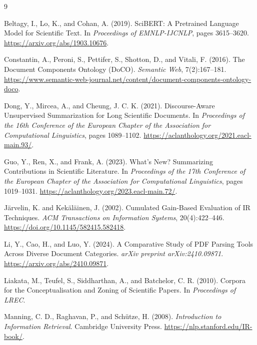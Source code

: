 \documentclass[12pt]{article}
\begin{document}
\begin{thebibliography}{9}

Beltagy, I., Lo, K., and Cohan, A. (2019).
\newblock SciBERT: A Pretrained Language Model for Scientific Text.
\newblock In \textit{Proceedings of EMNLP-IJCNLP}, pages 3615--3620.
\newblock \url{https://arxiv.org/abs/1903.10676}.

Constantin, A., Peroni, S., Pettifer, S., Shotton, D., and Vitali, F. (2016).
\newblock The Document Components Ontology (DoCO).
\newblock \textit{Semantic Web}, 7(2):167--181.
\newblock \url{https://www.semantic-web-journal.net/content/document-components-ontology-doco}.

Dong, Y., Mircea, A., and Cheung, J. C. K. (2021).
\newblock Discourse-Aware Unsupervised Summarization for Long Scientific Documents.
\newblock In \textit{Proceedings of the 16th Conference of the European Chapter of the Association for Computational Linguistics}, pages 1089--1102.
\newblock \url{https://aclanthology.org/2021.eacl-main.93/}.

Guo, Y., Ren, X., and Frank, A. (2023).
\newblock What's New? Summarizing Contributions in Scientific Literature.
\newblock In \textit{Proceedings of the 17th Conference of the European Chapter of the Association for Computational Linguistics}, pages 1019--1031.
\newblock \url{https://aclanthology.org/2023.eacl-main.72/}.

Järvelin, K. and Kekäläinen, J. (2002).
\newblock Cumulated Gain-Based Evaluation of IR Techniques.
\newblock \textit{ACM Transactions on Information Systems}, 20(4):422--446.
\newblock \url{https://doi.org/10.1145/582415.582418}.

Li, Y., Cao, H., and Luo, Y. (2024).
\newblock A Comparative Study of PDF Parsing Tools Across Diverse Document Categories.
\newblock \textit{arXiv preprint arXiv:2410.09871}.
\newblock \url{https://arxiv.org/abs/2410.09871}.

Liakata, M., Teufel, S., Siddharthan, A., and Batchelor, C. R. (2010).
\newblock Corpora for the Conceptualisation and Zoning of Scientific Papers.
\newblock In \textit{Proceedings of LREC}.

Manning, C. D., Raghavan, P., and Schütze, H. (2008).
\newblock \textit{Introduction to Information Retrieval}.
\newblock Cambridge University Press.
\newblock \url{https://nlp.stanford.edu/IR-book/}.


\end{thebibliography}
\end{document}

